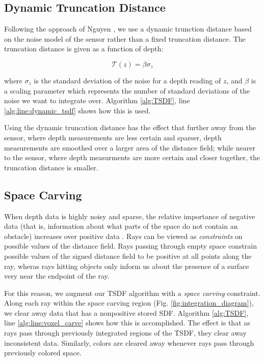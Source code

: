 \documentclass[10pt,twocolumn,letterpaper]{article}
\begin{document}
\subsection{Dynamic Truncation Distance}
Following the approach of Nguyen \etal\cite{Nguyen2012}, we use a dynamic
trunction distance based on the noise model of the sensor rather than a fixed
truncation distance. The truncation distance is given as a function of depth:

\begin{equation} \mathcal{T} (z) = \beta\sigma_{z} \end{equation}

\noindent where $\sigma_{z}$ is the standard deviation of the noise for a depth
reading of $z$, and $\beta$ is a scaling parameter which represents the number of
standard deviations of the noise we want to integrate over. Algorithm
\ref{alg:TSDF}, line \ref{alg:line:dynamic_tsdf} shows how this is used.

Using the dynamic truncation distance has the effect that further away from the
sensor, where depth measurements are less certain and sparser, depth
measurements are smoothed over a larger area of the distance field; while nearer
to the sensor, where depth measurments are more certain and closer together, the
truncation distance is smaller.

\subsection{Space Carving}
\label{section:carving}
When depth data is highly noisy and sparse, the relative importance of negative
data (that is, information about what parts of the space do not contain an
obstacle) increases over positive data \cite{Klingensmith2014}. Rays can be
viewed as \textit{constraints} on possible values of the distance field. Rays
passing through empty space constrain possible values of the signed distance
field to be positive at all points along the ray, wheras rays hitting objects 
only inform us about the presence of a surface very near the endpoint of the ray.

For this reason, we augment our TSDF algorithm with a \textit{space carving}
constraint. Along each ray within the space carving region (Fig.
\ref{fig:integration_diagram}), we clear away data that has a nonpositive stored
SDF. Algorithm \ref{alg:TSDF}, line \ref{alg:line:voxel_carve} shows how this is
accomplished. The effect is that as rays pass through previously integrated
regions of the TSDF, they clear away inconsistent data. Similarly, colors are
cleared away whenever rays pass through previously colored space.
\end{document}
